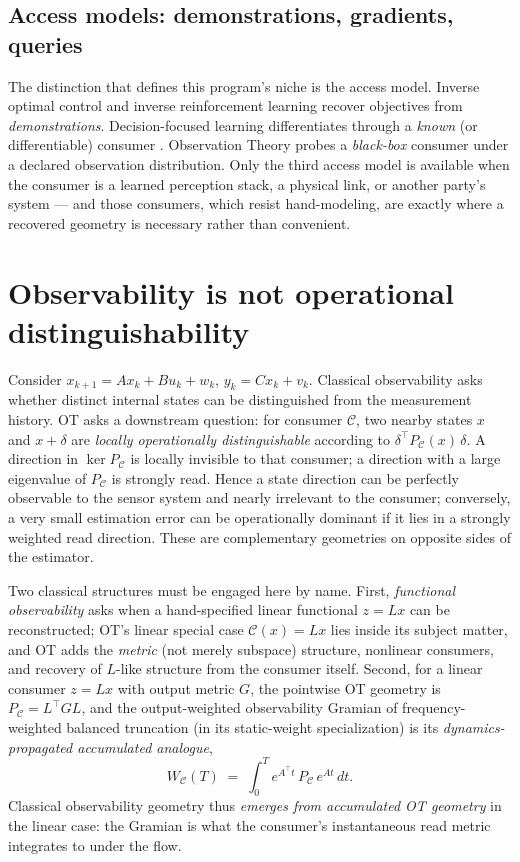 \documentclass{article}
\theoremstyle{definition}
\theoremstyle{remark}
\newcommand{\PC}{P_{\mathcal{C}}}
\newcommand{\C}{\mathcal{C}}
\begin{document}
\subsection{Access models: demonstrations, gradients, queries}
\label{sec:access}

The distinction that defines this program's niche is the access model.
Inverse optimal control and inverse reinforcement learning recover objectives
from \emph{demonstrations}. Decision-focused learning differentiates through
a \emph{known} (or differentiable) consumer
\citep{elmachtoub2022,amos2017,mandi2024}. Observation Theory probes a
\emph{black-box} consumer under a declared observation distribution. Only the
third access model is available when the consumer is a learned perception
stack, a physical link, or another party's system --- and those consumers,
which resist hand-modeling, are exactly where a recovered geometry is
necessary rather than convenient.

\section{Observability is not operational distinguishability}
\label{sec:observability}

Consider $x_{k+1}=Ax_k+Bu_k+w_k$, $y_k=Cx_k+v_k$. Classical observability
asks whether distinct internal states can be distinguished from the
measurement history. OT asks a downstream question: for consumer $\C$, two
nearby states $x$ and $x+\delta$ are \emph{locally operationally
distinguishable} according to $\delta^{\top}\PC(x)\,\delta$. A direction in
$\ker\PC$ is locally invisible to that consumer; a direction with a large
eigenvalue of $\PC$ is strongly read. Hence a state direction can be
perfectly observable to the sensor system and nearly irrelevant to the
consumer; conversely, a very small estimation error can be operationally
dominant if it lies in a strongly weighted read direction. These are
complementary geometries on opposite sides of the estimator.

Two classical structures must be engaged here by name. First,
\emph{functional observability} \citep{darouach2000,montanari2022} asks when a
hand-specified linear functional $z=Lx$ can be reconstructed; OT's linear
special case $\C(x)=Lx$ lies inside its subject matter, and OT adds the
\emph{metric} (not merely subspace) structure, nonlinear consumers, and
recovery of $L$-like structure from the consumer itself. Second, for a linear
consumer $z=Lx$ with output metric $G$, the pointwise OT geometry is
$\PC=L^{\top}GL$, and the output-weighted observability Gramian of
frequency-weighted balanced truncation \citep{enns1984} (in its
static-weight specialization) is its \emph{dynamics-propagated accumulated
analogue},
\begin{equation}
\label{eq:gramian}
W_\C(T)\;=\;\int_0^{T} e^{A^{\top}t}\,\PC\,e^{At}\,dt .
\end{equation}
Classical observability geometry thus \emph{emerges from accumulated OT
geometry} in the linear case: the Gramian is what the consumer's
instantaneous read metric integrates to under the flow.
\end{document}
